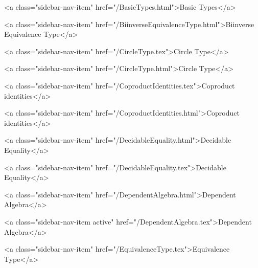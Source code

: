       
    
      
        
          <a class="sidebar-nav-item" href="/BasicTypes.html">Basic Types</a>
        
      
    
      
        
          <a class="sidebar-nav-item" href="/BiinverseEquivalenceType.html">Biinverse Equivalence Type</a>
        
      
    
      
        
          <a class="sidebar-nav-item" href="/CircleType.tex">Circle Type</a>
        
      
    
      
        
          <a class="sidebar-nav-item" href="/CircleType.html">Circle Type</a>
        
      
    
      
        
          <a class="sidebar-nav-item" href="/CoproductIdentities.tex">Coproduct identities</a>
        
      
    
      
        
          <a class="sidebar-nav-item" href="/CoproductIdentities.html">Coproduct identities</a>
        
      
    
      
        
          <a class="sidebar-nav-item" href="/DecidableEquality.html">Decidable Equality</a>
        
      
    
      
        
          <a class="sidebar-nav-item" href="/DecidableEquality.tex">Decidable Equality</a>
        
      
    
      
        
          <a class="sidebar-nav-item" href="/DependentAlgebra.html">Dependent Algebra</a>
        
      
    
      
        
          <a class="sidebar-nav-item active" href="/DependentAlgebra.tex">Dependent Algebra</a>
        
      
    
      
        
          <a class="sidebar-nav-item" href="/EquivalenceType.tex">Equivalence Type</a>
        
